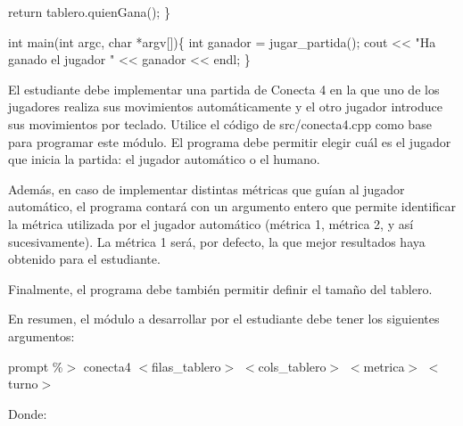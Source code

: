 \begin{DoxyCode}
    \textcolor{keywordflow}{return} tablero.quienGana();
\}

\textcolor{keywordtype}{int} main(\textcolor{keywordtype}{int} argc, \textcolor{keywordtype}{char} *argv[])\{
    \textcolor{keywordtype}{int} ganador = jugar\_partida();
    cout << \textcolor{stringliteral}{"Ha ganado el jugador "} << ganador << endl;
\}  
\end{DoxyCode}


El estudiante debe implementar una partida de Conecta 4 en la que uno de los jugadores realiza sus movimientos automáticamente y el otro jugador introduce sus movimientos por teclado. Utilice el código de {\ttfamily src/conecta4.\-cpp} como base para programar este módulo. El programa debe permitir elegir cuál es el jugador que inicia la partida\-: el jugador automático o el humano.

Además, en caso de implementar distintas métricas que guían al jugador automático, el programa contará con un argumento entero que permite identificar la métrica utilizada por el jugador automático (métrica 1, métrica 2, y así sucesivamente). La métrica 1 será, por defecto, la que mejor resultados haya obtenido para el estudiante.

Finalmente, el programa debe también permitir definir el tamaño del tablero.

En resumen, el módulo a desarrollar por el estudiante debe tener los siguientes argumentos\-:

{\ttfamily prompt \%$>$ conecta4 $<$filas\-\_\-tablero$>$ $<$cols\-\_\-tablero$>$ $<$metrica$>$ $<$turno$>$}

Donde\-:


